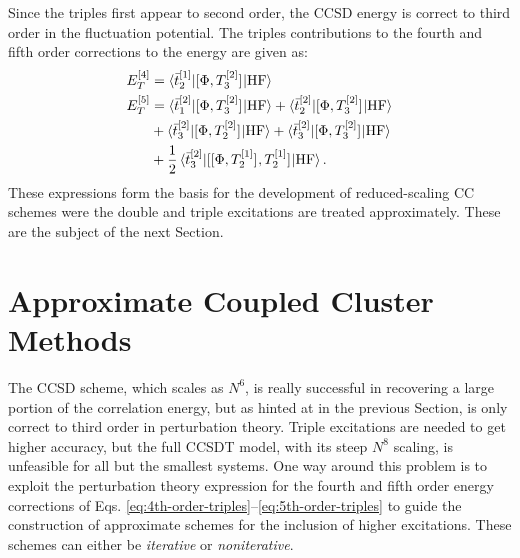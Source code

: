 Since the triples first appear to second order, the \gls{CCSD}
energy is correct to third order in the fluctuation potential.
The triples contributions to the fourth and fifth order corrections to
the energy are given as:
\begin{subequations}
  \begin{align}
    E_T^{[4]} &=
 \braket{\bar{t}_{2}^{[1]}| [ \Phi, T_3^{[2]} ]^{} | \mathrm{HF}}
 \label{eq:4th-order-triples} \\
    E_T^{[5]} &=
    \braket{\bar{t}_{1}^{[2]} | [ \Phi, T_3^{[2]} ]^{} | \mathrm{HF}}
  + \braket{\bar{t}_{2}^{[2]} | [ \Phi, T_3^{[2]} ]^{} | \mathrm{HF}}
  \nonumber \\
  &+ \braket{\bar{t}_{3}^{[2]} | [ \Phi, T_2^{[2]} ]^{} | \mathrm{HF}}
  + \braket{\bar{t}_{3}^{[2]} | [ \Phi, T_3^{[2]} ]^{} | \mathrm{HF}}
  \nonumber \\
    &+
    \frac{1}{2}\braket{\bar{t}_{3}^{[2]} |
    [ [ \Phi, T_2^{[1]} ]^{}, T_2^{[1]} ]^{}
    | \mathrm{HF}}.
 \label{eq:5th-order-triples}
  \end{align}
\end{subequations}
These expressions form the basis for the development of reduced-scaling
\acrshort{CC} schemes were the double and triple excitations are treated
approximately. These are the subject of the next Section.

\section{Approximate Coupled Cluster Methods}\label{sec:cc-approximate}

The \acrshort{CCSD} scheme, which scales as $N^6$, is really successful
in recovering a large portion of the correlation energy, but as hinted
at in the previous Section, is only correct to third order in
perturbation theory.
Triple excitations are needed to get higher accuracy, but the full
\gls{CCSDT} model, with its steep $N^8$ scaling, is unfeasible for all
but the smallest systems.
One way around this problem is to exploit the perturbation theory
expression for the fourth and fifth order energy corrections of Eqs.
\eqref{eq:4th-order-triples}--\eqref{eq:5th-order-triples} to guide the
construction of approximate schemes for the inclusion of higher
excitations. These schemes can either be \emph{iterative} or
\emph{noniterative}.

